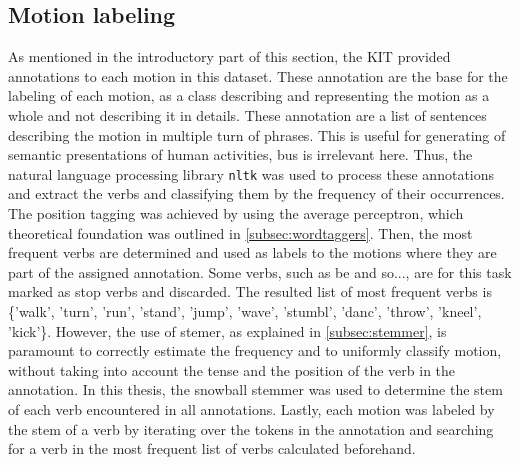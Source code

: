 \subsection{Motion labeling}
As mentioned in the introductory part of this section, the KIT provided annotations to each motion in this dataset. These annotation are the base for the labeling of each motion, as a class describing and representing the motion as a whole and not describing it in details. These annotation are a list of sentences describing the motion in multiple turn of phrases. This is useful for generating of semantic presentations of human activities, bus is irrelevant here. Thus, the natural language processing library \texttt{nltk} was used to process these annotations and extract the verbs and classifying them by the frequency of their occurrences. The position tagging was achieved by using the average perceptron, which theoretical foundation was outlined in \ref{subsec:wordtaggers}. Then, the most frequent verbs are determined and used as labels to the motions where they are part of the assigned annotation. Some verbs, such as be and so..., are for this task marked as stop verbs and discarded. The resulted list of most frequent verbs is \{'walk', 'turn', 'run', 'stand', 'jump', 'wave', 'stumbl', 'danc', 'throw', 'kneel', 'kick'\}. However, the use of stemer, as explained in \ref{subsec:stemmer}, is paramount to correctly estimate the frequency and to uniformly classify motion, without taking into account the tense and the position of the verb in the annotation. In this thesis, the snowball stemmer was used to determine the stem of each verb encountered in all annotations. Lastly, each motion was labeled by the stem of a verb by iterating over the tokens in the annotation and searching for a verb in the most frequent list of verbs calculated beforehand.
